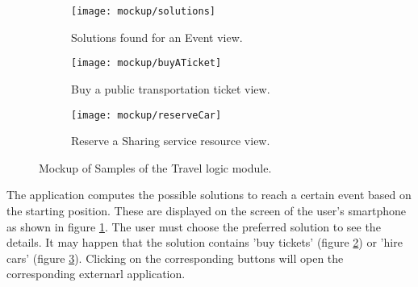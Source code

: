 
\begin{figure}[H]	
	\begin{subfigure}{0.5\linewidth}
		\centering		
		\texttt{[image: mockup/solutions]} 
		\caption{Solutions found for an Event view.}
		\label{fig:solutions}
	\end{subfigure}
	\begin{subfigure}{0.5\linewidth}
		\texttt{[image: mockup/buyATicket]} 
		\centering
		\caption{Buy a public transportation ticket view.}
		\label{fig:buyTicket}
	\end{subfigure} 
	\hfill
	
	\bigskip	
	\begin{subfigure}{\linewidth}
			\centering
		\texttt{[image: mockup/reserveCar]} 
		\caption{Reserve a Sharing service resource view.}
		\label{fig:reserveCar}
	\end{subfigure}

	\caption{Mockup of Samples of the Travel logic module.}
	\label{fig:travelLogic}
\end{figure}

	The application computes the possible solutions to reach a certain event based on the starting position. These are displayed on the screen of the user's smartphone as shown in figure \ref{fig:solutions}. The user must choose the preferred solution to see the details. It may happen that the solution contains 'buy tickets' (figure \ref{fig:buyTicket}) or 'hire cars' (figure \ref{fig:reserveCar}). Clicking on the corresponding buttons will open the corresponding externarl application.
